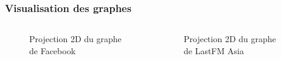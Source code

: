 \documentclass[11pt]{beamer}
\begin{document}
	\begin{frame}
		\frametitle{Visualisation des graphes}
		\begin{columns}
			\begin{column}[c]{0.5\textwidth}
				\begin{figure}
				\caption{\small Projection 2D du graphe de Facebook}
				\end{figure}
			\end{column}
			\begin{column}[c]{0.5\textwidth}
				\begin{figure}
				\caption{\small Projection 2D du graphe de LastFM Asia}
				\end{figure}
			\end{column}
		\end{columns}
	\end{frame}
\end{document}
